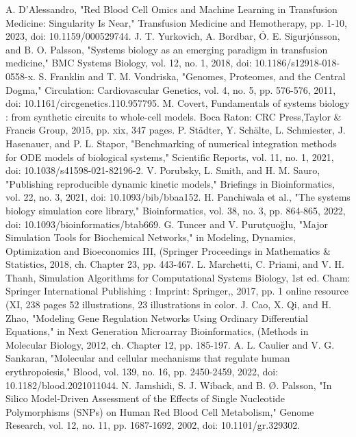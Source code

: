 \documentclass[conference]{IEEEtran}
\begin{document}
\begin{thebibliography}{00}
 A. D’Alessandro, "Red Blood Cell Omics and Machine Learning in Transfusion Medicine: Singularity Is Near," Transfusion Medicine and Hemotherapy, pp. 1-10, 2023, doi: 10.1159/000529744.
 J. T. Yurkovich, A. Bordbar, Ó. E. Sigurjónsson, and B. O. Palsson, "Systems biology as an emerging paradigm in transfusion medicine," BMC Systems Biology, vol. 12, no. 1, 2018, doi: 10.1186/s12918-018-0558-x.
 S. Franklin and T. M. Vondriska, "Genomes, Proteomes, and the Central Dogma," Circulation: Cardiovascular Genetics, vol. 4, no. 5, pp. 576-576, 2011, doi: 10.1161/circgenetics.110.957795.
 M. Covert, Fundamentals of systems biology : from synthetic circuits to whole-cell models. Boca Raton: CRC Press,Taylor \& Francis Group, 2015, pp. xix, 347 pages.
 P. Städter, Y. Schälte, L. Schmiester, J. Hasenauer, and P. L. Stapor, "Benchmarking of numerical integration methods for ODE models of biological systems," Scientific Reports, vol. 11, no. 1, 2021, doi: 10.1038/s41598-021-82196-2.
 V. Porubsky, L. Smith, and H. M. Sauro, "Publishing reproducible dynamic kinetic models," Briefings in Bioinformatics, vol. 22, no. 3, 2021, doi: 10.1093/bib/bbaa152.
 H. Panchiwala et al., "The systems biology simulation core library," Bioinformatics, vol. 38, no. 3, pp. 864-865, 2022, doi: 10.1093/bioinformatics/btab669.
 G. Tuncer and V. Purutçuoğlu, "Major Simulation Tools for Biochemical Networks," in Modeling, Dynamics, Optimization and Bioeconomics III, (Springer Proceedings in Mathematics \& Statistics, 2018, ch. Chapter 23, pp. 443-467.
 L. Marchetti, C. Priami, and V. H. Thanh, Simulation Algorithms for Computational Systems Biology, 1st ed. Cham: Springer International Publishing : Imprint: Springer,, 2017, pp. 1 online resource (XI, 238 pages 52 illustrations, 23 illustrations in color.
 J. Cao, X. Qi, and H. Zhao, "Modeling Gene Regulation Networks Using Ordinary Differential Equations," in Next Generation Microarray Bioinformatics, (Methods in Molecular Biology, 2012, ch. Chapter 12, pp. 185-197.
 A. L. Caulier and V. G. Sankaran, "Molecular and cellular mechanisms that regulate human erythropoiesis," Blood, vol. 139, no. 16, pp. 2450-2459, 2022, doi: 10.1182/blood.2021011044.
 N. Jamshidi, S. J. Wiback, and B. Ø. Palsson, "In Silico Model-Driven Assessment of the Effects of Single Nucleotide Polymorphisms (SNPs) on Human Red Blood Cell Metabolism," Genome Research, vol. 12, no. 11, pp. 1687-1692, 2002, doi: 10.1101/gr.329302.

\end{thebibliography}
\end{document}
